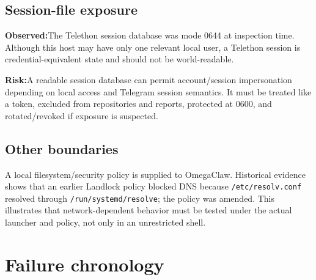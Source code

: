 \documentclass[10pt]{article}
\newcommand{\code}[1]{\texttt{#1}}
\newcommand{\observed}{\textbf{Observed:}}
\newcommand{\risk}{\textbf{Risk:}}
\begin{document}
\subsection{Session-file exposure}

\observed The Telethon session database was mode 0644 at inspection time. Although this host may have only one relevant local user, a Telethon session is credential-equivalent state and should not be world-readable.

\risk A readable session database can permit account/session impersonation depending on local access and Telegram session semantics. It must be treated like a token, excluded from repositories and reports, protected at 0600, and rotated/revoked if exposure is suspected.

\subsection{Other boundaries}

A local filesystem/security policy is supplied to OmegaClaw. Historical evidence shows that an earlier Landlock policy blocked DNS because \code{/etc/resolv.conf} resolved through \code{/run/systemd/resolve}; the policy was amended. This illustrates that network-dependent behavior must be tested under the actual launcher and policy, not only in an unrestricted shell.

\section{Failure chronology}
\end{document}
